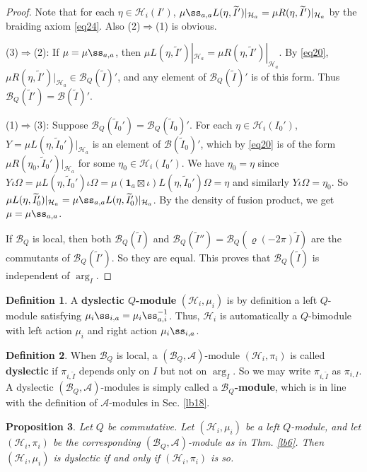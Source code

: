 \documentclass[11pt,b5paper,notitlepage]{article}
\theoremstyle{definition}
\newtheorem{df}{Definition}[section]
\theoremstyle{plain}
\newtheorem{pp}[df]{Proposition}
\newcommand{\mc}{\mathcal}
\newcommand{\wtd}{\widetilde}
\newcommand{\id}{\mathbf{1}}
\numberwithin{equation}{section}
\begin{document}
\begin{proof}
Note that 	for each $\eta\in\mc H_i(I')$, $\mu\ss_{a,a}L(\eta,\wtd I')|_{\mc H_a}=\mu R(\eta,\wtd I')|_{\mc H_a}$ by the braiding axiom \eqref{eq24}. Also (2)$\Rightarrow$(1) is obvious. 

(3)$\Rightarrow$(2): If $\mu=\mu\ss_{a,a}$, then $\mu L(\eta,\wtd I')|_{\mc H_a}=\mu R(\eta,\wtd I')|_{\mc H_a}$.  By \eqref{eq20}, $\mu R(\eta,\wtd I')|_{\mc H_a}\in\mc B_Q(\wtd I)'$, and any element of $\mc B_Q(\wtd I)'$ is of this form. Thus $\mc B_Q(\wtd I')=\mc B(\wtd I)'$.

(1)$\Rightarrow$(3): Suppose $\mc B_Q(\wtd I_0')=\mc B_Q(\wtd I_0)'$. For each $\eta\in\mc H_i(I_0')$, $Y=\mu L(\eta,\wtd I_0')|_{\mc H_a}$	is an element of $\mc B(\wtd I_0)'$, which by \eqref{eq20} is of the form $\mu R(\eta_0,\wtd I_0')|_{\mc H_a}$ for some $\eta_0\in\mc H_i(I_0')$. We have $\eta_0=\eta$ since $Y\iota\Omega=\mu L(\eta,\wtd I_0')\iota\Omega=\mu(\id_a\boxtimes\iota)L(\eta,\wtd I_0')\Omega=\eta$ and similarly $Y\iota\Omega=\eta_0$. So $\mu L(\eta,\wtd I_0')|_{\mc H_a}=\mu\ss_{a,a}L(\eta,\wtd I_0')|_{\mc H_a}$. By the density of fusion product, we get $\mu=\mu\ss_{a,a}$.

If $\mc B_Q$ is local, then both $\mc B_Q(\wtd I)$ and $\mc B_Q(\wtd I'')=\mc B_Q(\varrho(-2\pi)\wtd I)$ are the commutants of $\mc B_Q(\wtd I')$. So they are equal. This proves that $\mc B_Q(\wtd I)$ is independent of $\arg_I$.
\end{proof}


\begin{df}
A \textbf{dyslectic $Q$-module} $(\mc H_i,\mu_i)$ is by definition a left $Q$-module satisfying $\mu_i\ss_{i,a}=\mu_i\ss_{a,i}^{-1}$. Thus, $\mc H_i$ is automatically a $Q$-bimodule with left action $\mu_i$ and right action $\mu_i\ss_{i,a}$.
\end{df}

\begin{df}
When $\mc B_Q$ is local, a $(\mc B_Q,\mc A)$-module $(\mc H_i,\pi_i)$ is called \textbf{dyslectic} if $\pi_{i,\wtd I}$ depends only on $I$ but not on $\arg_I$. So we may write $\pi_{i,\wtd I}$ as $\pi_{i,I}$. A dyslectic $(\mc B_Q,\mc A)$-modules is simply called a \textbf{$\mc B_Q$-module}, which is in line with the definition of $\mc A$-modules in Sec. \ref{lb18}.
\end{df}




\begin{pp}\label{lb22}
Let $Q$ be commutative. Let $(\mc H_i,\mu_i)$ be a left $Q$-module, and let $(\mc H_i,\pi_i)$ be the corresponding $(\mc B_Q,\mc A)$-module as in Thm. \ref{lb6}. Then $(\mc H_i,\mu_i)$ is dyslectic if and only if $(\mc H_i,\pi_i)$ is so.
\end{pp}
\end{document}
